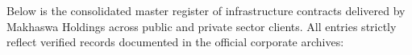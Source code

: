 \hypertarget{sec:projects}{}

\noindent
{\fontsize{8.6pt}{12.0pt}\selectfont\color{mhtext}
Below is the consolidated master register of infrastructure contracts delivered by Makhaswa Holdings across public and private sector clients. All entries strictly reflect verified records documented in the official corporate archives:
}

\vspace{0.18cm}


